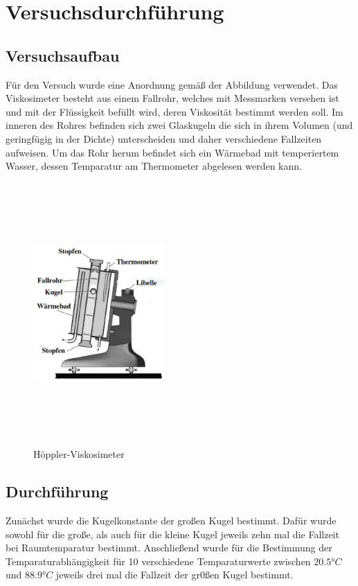\section{Versuchsdurchführung}
\label{sec:durchfuehrung}
\subsection{Versuchsaufbau}
\label{sec:aufbau}
Für den Versuch wurde eine Anordnung gemäß der Abbildung verwendet. Das Viskosimeter besteht aus einem Fallrohr, welches mit Messmarken versehen ist und mit der Flüssigkeit befüllt wird, deren Viskosität bestimmt werden soll. Im inneren des Rohres befinden sich zwei Glaskugeln die sich in ihrem Volumen (und geringfügig in der Dichte) unterscheiden und daher verschiedene Fallzeiten aufweisen. Um das Rohr herum befindet sich ein Wärmebad mit temperiertem Wasser, dessen Temparatur am Thermometer abgelesen werden kann. 
\begin{figure}[h]
  \centering
  \includegraphics[width=5cm,height=10cm,keepaspectratio]{Viskosimeter.pdf} %
  \caption{Höppler-Viskosimeter} %
  \label{fig:vanadium}
\end{figure}
\subsection{Durchführung}
Zunächst wurde die Kugelkonstante der großen Kugel bestimmt. Dafür wurde sowohl für die große, als auch für die kleine Kugel jeweils zehn mal die Fallzeit bei Raumtemparatur bestimmt. Anschließend wurde für die Bestimmung der Temparaturabhängigkeit für 10 verschiedene Temparaturwerte zwischen $20.5°C$ und $88.9°C$ jeweils drei mal die Fallzeit der gr0ßen Kugel bestimmt.

